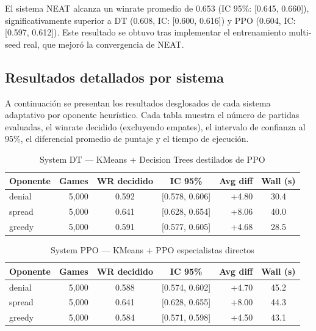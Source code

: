 El sistema NEAT alcanza un winrate promedio de 0.653 (IC 95\%: [0.645, 0.660]), significativamente superior a DT (0.608, IC: [0.600, 0.616]) y PPO (0.604, IC: [0.597, 0.612]). Este resultado se obtuvo tras implementar el entrenamiento multi-seed real, que mejoró la convergencia de NEAT.

\subsection{Resultados detallados por sistema}

A continuación se presentan los resultados desglosados de cada sistema adaptativo por oponente heurístico. Cada tabla muestra el número de partidas evaluadas, el winrate decidido (excluyendo empates), el intervalo de confianza al 95\%, el diferencial promedio de puntaje y el tiempo de ejecución.

\begin{table}[H]
\centering
\caption{System DT --- KMeans + Decision Trees destilados de PPO}
\begin{tabular}{lrccrc}
\hline
\textbf{Oponente} & \textbf{Games} & \textbf{WR decidido} & \textbf{IC 95\%} & \textbf{Avg diff} & \textbf{Wall (s)} \\
\hline
denial & 5,000 & 0.592 & [0.578, 0.606] & +4.80 & 30.4 \\
spread & 5,000 & 0.641 & [0.628, 0.654] & +8.06 & 40.0 \\
greedy & 5,000 & 0.591 & [0.577, 0.605] & +4.68 & 28.5 \\
\hline
\end{tabular}
\label{tab:system_dt}
\end{table}

\begin{table}[H]
\centering
\caption{System PPO --- KMeans + PPO especialistas directos}
\begin{tabular}{lrccrc}
\hline
\textbf{Oponente} & \textbf{Games} & \textbf{WR decidido} & \textbf{IC 95\%} & \textbf{Avg diff} & \textbf{Wall (s)} \\
\hline
denial & 5,000 & 0.588 & [0.574, 0.602] & +4.70 & 45.2 \\
spread & 5,000 & 0.641 & [0.628, 0.655] & +8.00 & 44.3 \\
greedy & 5,000 & 0.584 & [0.571, 0.598] & +4.50 & 43.1 \\
\hline
\end{tabular}
\label{tab:system_ppo}
\end{table}


